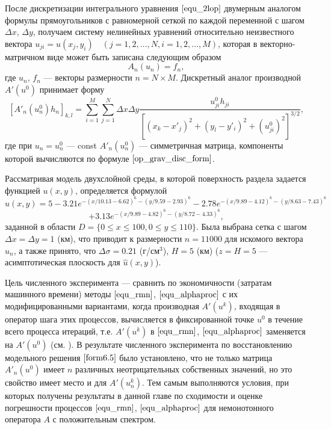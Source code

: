 После дискретизации интегрального уравнения $\eqref{equ_2lop}$ двумерным аналогом формулы прямоугольников с равномерной сеткой по каждой переменной с шагом $\Delta x$, $\Delta y$, получаем систему нелинейных уравнений относительно неизвестного вектора $u_{ji}=u(x_j,y_i)\quad (j=1,2,...,N, i=1,2,...,M)$, которая в векторно-матричном виде может быть записана следующим образом
\begin{equation}\label{equ_snle}
	A_n(u_n)=f_n,
\end{equation}
где $u_n$, $f_n$ --- векторы размерности $n=N\times M$. Дискретный аналог производной $A'(u^0)$ принимает форму
\begin{equation}\label{op_grav_disc_form}
	[A'_n(u_n^0)h_n]_{k,l}=\sum\limits_{i=1}^{M}\sum\limits_{j=1}^{N}
	\Delta x\Delta y\frac{u^0_{ji}h_{ji}}{[(x_k-x'_j)^2+(y_l-y'_i)^2+(u^0_{ji})^2]^{3/2}},
\end{equation}
где при $u_n=u_{n}^{0}$ --- const $A'_n(u_n^0)$ --- симметричная матрица, компоненты которой вычисляются по формуле $\eqref{op_grav_disc_form}$.

Рассматривая модель двухслойной среды, в которой поверхность раздела задается функцией $u(x,y)$, определяется формулой \cite{AkMisSkTr2015}
$$
\hat{u}(x,y)=5-3.21e^{-(x/10.13-6.62)^6-(y/9.59-2.93)^6}-
2.78e^{-(x/9.89-4.12)^6-(y/8.63-7.43)^6}$$
\begin{equation}\label{form6.5}
+3.13e^{-(x/9.89-4.82)^6-(y/8.72-4.33)^6},
\end{equation}
заданной в области $D=\{0\le x\le 100, 0\le y \le 110\}$. Была выбрана сетка с шагом $\Delta x=\Delta y=1$ (км), что приводит к размерности $n=11000$ для искомого вектора $u_n$, а также принято, что $\Delta\sigma=0.21$ (г/см$^3$), $H=5$ (км) ($z=H=5$ --- асимптотическая плоскость для $\hat{u}(x,y)$).

Цель численного эксперимента --- сравнить по экономичности (затратам машинного времени) методы $\eqref{equ_rmn}$, $\eqref{equ_alphaproc}$ с их модифицированными вариантами, когда производная $A'(u^k)$, входящая в оператор шага этих процессов, вычисляется в фиксированной точке $u^0$ в течение всего процесса итераций, т.е. $A'(u^k)$ в $\eqref{equ_rmn}$, $\eqref{equ_alphaproc}$ заменяется на $A'(u^0)$ (см. \cite{Vasin2014, Vasin2016}). В результате численного эксперимента по восстановлению модельного решения $\eqref{form6.5}$ было установлено, что не только матрица $A'_n(u^0)$ имеет $n$ различных неотрицательных собственных значений, но это свойство имеет место и для $A'(u_n^k)$. Тем самым выполняются условия, при которых получены результаты в данной главе по сходимости и оценке погрешности процессов $\eqref{equ_rmn}$, $\eqref{equ_alphaproc}$ для немонотонного оператора $A$ с положительным спектром. 

